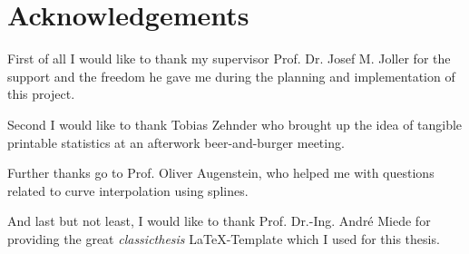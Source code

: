

\bigskip


\begingroup

\let\clearpage\relax
\let\cleardoublepage\relax
\let\cleardoublepage\relax

\chapter*{Acknowledgements} %

First of all I would like to thank my supervisor Prof. Dr. Josef M. Joller for
the support and the freedom he gave me during the planning and implementation of
this project.

Second I would like to thank Tobias Zehnder who brought up the idea of tangible
printable statistics at an afterwork beer-and-burger meeting.

Further thanks go to Prof. Oliver Augenstein, who helped me with questions
related to curve interpolation using splines.

And last but not least, I would like to thank Prof. Dr.-Ing. André Miede for
providing the great \emph{classicthesis} \LaTeX-Template which I used for this
thesis.

\endgroup
